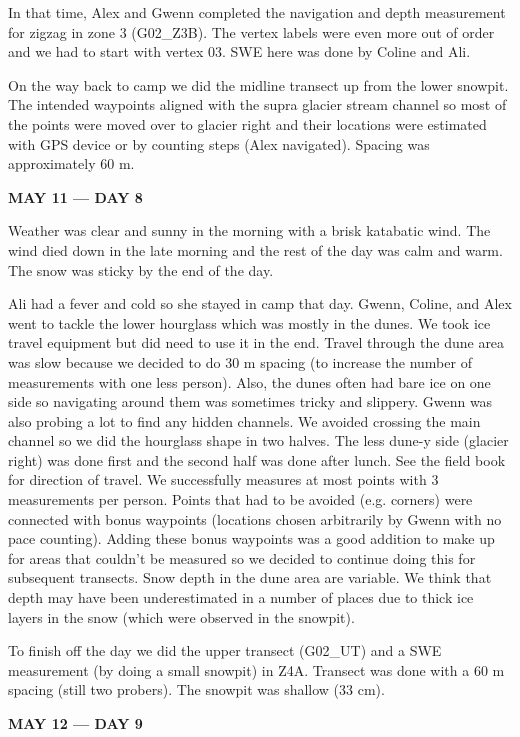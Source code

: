 \documentclass[12pt]{article}
\begin{document}
In that time, Alex and Gwenn completed the navigation and depth measurement for zigzag in zone 3 (G02\_Z3B). The vertex labels were even more out of order and we had to start with vertex 03. SWE here was done by Coline and Ali.

On the way back to camp we did the midline transect up from the lower snowpit. The intended waypoints aligned with the supra glacier stream channel so most of the points were moved over to glacier right and their locations were estimated with GPS device or by counting steps (Alex navigated). Spacing was approximately 60 m.  

\vspace{4mm}
\noindent \textbf{MAY 11 --- DAY 8}

Weather was clear and sunny in the morning with a brisk katabatic wind. The wind died down in the late morning and the rest of the day was calm and warm. The snow was sticky by the end of the day.  

Ali had a fever and cold so she stayed in camp that day. Gwenn, Coline, and Alex went to tackle the lower hourglass which was mostly in the dunes. We took ice travel equipment but did need to use it in the end. Travel through the dune area was slow because we decided to do 30 m spacing (to increase the number of measurements with one less person). Also, the dunes often had bare ice on one side so navigating around them was sometimes tricky and slippery. Gwenn was also probing a lot to find any hidden channels. We avoided crossing the main channel so we did the hourglass shape in two halves. The less dune-y side (glacier right) was done first and the second half was done after lunch. See the field book for direction of travel. We successfully measures at most points with 3 measurements per person. Points that had to be avoided (e.g. corners) were connected with bonus waypoints (locations chosen arbitrarily by Gwenn with no pace counting). Adding these bonus waypoints was a good addition to make up for areas that couldn't be measured so we decided to continue doing this for subsequent transects.  Snow depth in the dune area are variable. We think that depth may have been underestimated in a number of places due to thick ice layers in the snow (which were observed in the snowpit). 

To finish off the day we did the upper transect (G02\_UT) and a SWE measurement (by doing a small snowpit) in Z4A. Transect was done with a 60 m spacing (still two probers). The snowpit was shallow (33 cm). 

\vspace{4mm}
\noindent \textbf{MAY 12 --- DAY 9}
\end{document}
